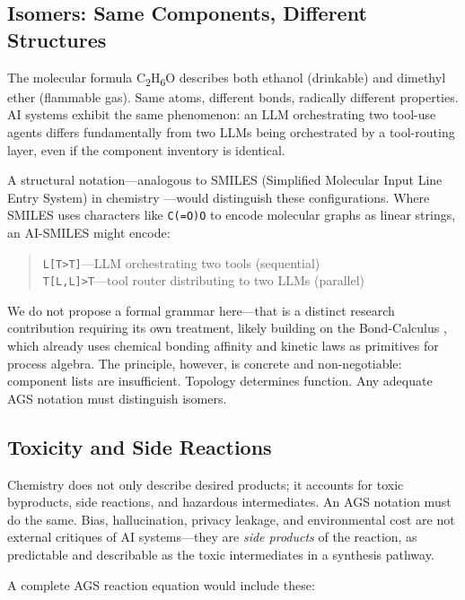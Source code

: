 \documentclass[12pt]{article}
\begin{document}
\subsection{Isomers: Same Components, Different Structures}
\label{sec:isomers}

The molecular formula C\textsubscript{2}H\textsubscript{6}O describes both ethanol (drinkable) and dimethyl ether (flammable gas). Same atoms, different bonds, radically different properties. AI systems exhibit the same phenomenon: an LLM orchestrating two tool-use agents differs fundamentally from two LLMs being orchestrated by a tool-routing layer, even if the component inventory is identical.

A structural notation---analogous to SMILES (Simplified Molecular Input Line Entry System) in chemistry \citep{weininger1988}---would distinguish these configurations. Where SMILES uses characters like \texttt{C(=O)O} to encode molecular graphs as linear strings, an AI-SMILES might encode:

\begin{quote}
\texttt{L[T>T]}---LLM orchestrating two tools (sequential) \\
\texttt{T[L,L]>T}---tool router distributing to two LLMs (parallel)
\end{quote}

We do not propose a formal grammar here---that is a distinct research contribution requiring its own treatment, likely building on the Bond-Calculus \citep{wright2018}, which already uses chemical bonding affinity and kinetic laws as primitives for process algebra. The principle, however, is concrete and non-negotiable: component lists are insufficient. Topology determines function. Any adequate AGS notation must distinguish isomers.

\subsection{Toxicity and Side Reactions}
\label{sec:toxicity}

Chemistry does not only describe desired products; it accounts for toxic byproducts, side reactions, and hazardous intermediates. An AGS notation must do the same. Bias, hallucination, privacy leakage, and environmental cost are not external critiques of AI systems---they are \emph{side products} of the reaction, as predictable and describable as the toxic intermediates in a synthesis pathway.

A complete AGS reaction equation would include these:
\end{document}
